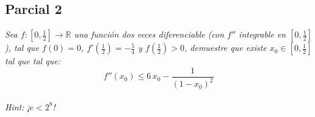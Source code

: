 \documentclass[11pt,letterpaper]{article}
\newcommand{\R}{\mathbb{R}}
\begin{document}
\subsection*{Parcial 2}
\begin{tcolorbox}[
	title = \textcolor{black}{\textcolor{white}{Parcial 2}},]
\textit{Sea $f:\left[0,\frac{1}{2}\right]\rightarrow \R$ una funci\'on dos veces diferenciable (con $f''$ integrable en $\left[0,\frac{1}{2}\right]$), tal que $f(0)=0$, $f'\left(\frac{1}{2}\right)=-\frac{5}{4}$ y $f\left(\frac{1}{2}\right)>0$, demuestre que existe $x_0\in \left[0,\frac{1}{2}\right]$ tal que
tal que:\,\\
\begin{equation*}
    f''(x_0)\leq 6\,x_0-\frac{1}{(1-x_0)^2}
\end{equation*}\,\\
Hint:\,\,¡$e<2^8$!}
\end{tcolorbox}
\end{document}
